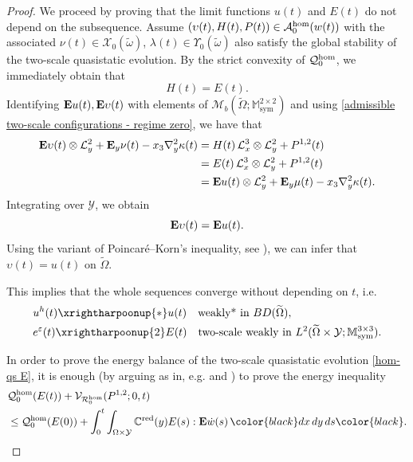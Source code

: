 \documentclass[reqno,10pt]{amsart}
\numberwithin{equation}{section}
\theoremstyle{remark}
\newcommand{\BLACK}{\color{black}}
\newcommand{\PINK}{\color{black}}
\newcommand{\calA}{\mathcal{A}}
\newcommand{\C}{\mathbb{C}}
\newcommand{\calL}{\mathcal{L}}
\newcommand{\M}{\mathbb{M}}
\newcommand{\calQ}{\mathcal{Q}}
\newcommand{\calR}{\mathcal{R}}
\newcommand{\calV}{\mathcal{V}}
\newcommand{\calY}{\mathcal{Y}}
\DeclareMathOperator{\sym}{sym}
\newcommand{\weakstar}{\xrightharpoonup{*}}
\newcommand{\weaktwoscale}{\xrightharpoonup{2}}
\newcommand{\eps}{\varepsilon}
\newcommand{\Mb}{\mathcal{M}_b}
\newcommand{\calXzero}[1]{\mathcal{X}_0({#1})}
\newcommand{\calYzero}[1]{\Upsilon_0({#1})}
\newcommand{\ext}[1]{\widetilde{#1}}
\newcommand{\E}{{\bf E}}
\newcommand{\D}{\nabla}
\newcommand{\red}[1]{#1^{\rm red}}
\begin{document}
\begin{proof}
We proceed by proving that the limit functions $u(t)$ and $E(t)$ do not depend on the subsequence. 
Assume $(\upsilon(t),H(t),P(t)) \in \calA^{\rm hom}_{0}(w(t)) $ with the associated $\nu(t) \in \calXzero{\ext{\omega}}$, $\lambda(t) \in \calYzero{\ext{\omega}}$ also satisfy the global stability of the two-scale quasistatic evolution. 
By the strict convexity of $\calQ^{\rm hom}_{0}$, we immediately obtain that
\begin{equation*}
	H(t) = E(t).
\end{equation*}
Identifying ${\E}u(t), {\E}\upsilon(t)$ with elements of $\Mb(\ext{\Omega};\M^{2 \times 2}_{\sym})$ and using \eqref{admissible two-scale configurations - regime zero}, we have that
\begin{align*}
	{\E}\upsilon(t) \otimes \calL^{2}_{y} + {\E}_{y}\nu(t) - x_3 {\D}^2_{y}\kappa(t) & = H(t) \,\calL^{3}_{x} \otimes \calL^{2}_{y} + P^{1,2}(t)\\
	& = E(t) \,\calL^{3}_{x} \otimes \calL^{2}_{y} + P^{1,2}(t)\\
	& = {\E}u(t) \otimes \calL^{2}_{y} + {\E}_{y}\mu(t) - x_3 {\D}^2_{y}\kappa(t).
\end{align*}
Integrating over $\calY$, we obtain
\begin{equation*}
	{\E}\upsilon(t) = {\E}u(t).
\end{equation*}
Using the variant of Poincar\'{e}--Korn's inequality, see \cite[Chapter II, Proposition 2.4]{Temam.1985}), we can infer that $\upsilon(t) = u(t)$ on $\ext{\Omega}$.

This implies that the whole sequences converge without depending on $t$, i.e.
\begin{align*}
	& u^h(t) \weakstar u(t) \quad \text{weakly* in $BD(\ext{\Omega})$},\\
	& e^\eps(t) \weaktwoscale E(t) \quad \text{two-scale weakly in $L^2(\ext{\Omega} \times \calY;\M^{3 \times 3}_{\sym})$}.
\end{align*}


In order to prove the energy balance of the two-scale quasistatic evolution \ref{hom-qs E}, it is enough (by arguing as in, e.g. \cite[Theorem 4.7]{DalMaso.DeSimone.Mora.2006} and \cite[Theorem 2.7]{Francfort.Giacomini.2012}) to prove the energy inequality
\begin{align} \label{main result hom - step 3 inequality}
\begin{split}
	& \calQ^{\rm hom}_{0}(E(t)) + \calV_{\calR^{\rm hom}_{0}}(P^{1,2}; 0, t) \\
	& \leq \calQ^{\rm hom}_{0}(E(0)) 
	+ \int_0^t \int_{\Omega \times \calY} \red{\C}(y) E(s) : {\E}\dot{w}(s) \,{\PINK dx\,dy\,ds\BLACK}.
\end{split}
\end{align}


\end{proof}
\end{document}
